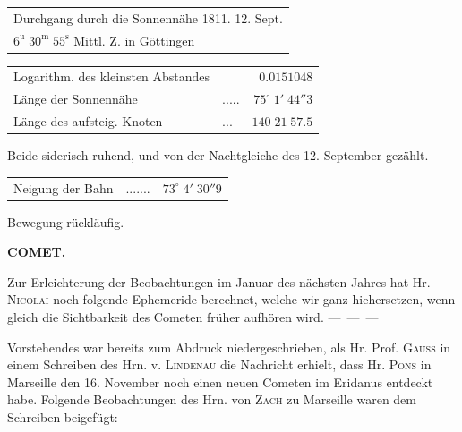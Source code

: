 \begin{center}\fontsize{10}{12}\selectfont\setlength{\tabcolsep}{4pt}\renewcommand{\arraystretch}{1.15}\begin{tabular}{l}
Durchgang durch die Sonnennähe 1811. 12. Sept.\\
\quad $6^{\mathrm u}\;30^{\mathrm m}\;55^{\mathrm s}$ Mittl. Z. in Göttingen\\
\end{tabular}\end{center}
\begin{center}\fontsize{10}{12}\selectfont\setlength{\tabcolsep}{3pt}\renewcommand{\arraystretch}{1.15}\begin{tabular}{llr}
Logarithm. des kleinsten Abstandes &  & $0.0151048$\\
Länge der Sonnennähe & .\;.\;.\;.\;. & $75^\circ\;1'\;44''3$\\
Länge des aufsteig. Knoten & .\;.\;. & $140\;21\;57.5$\\
\end{tabular}\end{center}
\noindent Beide siderisch ruhend, und von der Nachtgleiche des 12. September gezählt.
\begin{center}\fontsize{10}{12}\selectfont\setlength{\tabcolsep}{3pt}\renewcommand{\arraystretch}{1.15}\begin{tabular}{llr}
Neigung der Bahn & .\;.\;.\;.\;.\;.\;. & $73^\circ\;4'\;30''9$\\
\end{tabular}\end{center}
\noindent Bewegung rückläufig.

\clearpage
\thispagestyle{empty}
\noindent{}%
\makebox[12mm][l]{}%
\parbox[t]{\dimexpr\linewidth-24mm\relax}{\centering\footnotesize\bfseries COMET.\par}%
\par\nobreak\medskip
\par\indent Zur Erleichterung der Beobachtungen im Januar des nächsten Jahres hat Hr. \textsc{Nicolai} noch folgende Ephemeride berechnet, welche wir ganz hiehersetzen, wenn gleich die Sichtbarkeit des Cometen früher aufhören wird. \mbox{--- --- ---}


\par\indent Vorstehendes war bereits zum Abdruck niedergeschrieben, als Hr. Prof. \textsc{Gauss} in einem Schreiben des Hrn. v. \textsc{Lindenau} die Nachricht erhielt, dass Hr. \textsc{Pons} in Marseille den 16. November noch einen neuen Cometen im Eridanus entdeckt habe. Folgende Beobachtungen des Hrn. von \textsc{Zach} zu Marseille waren dem Schreiben beigefügt:

